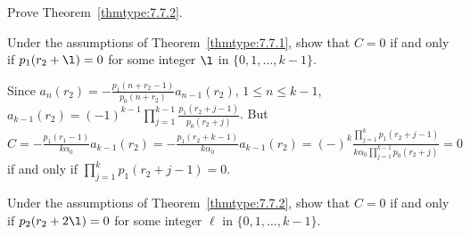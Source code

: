 \documentclass{ximera}
\begin{document}
\begin{problem}\label{exer:7.7.43}
Prove Theorem~\ref{thmtype:7.7.2}.
\end{problem}

\begin{problem}\label{exer:7.7.44}
Under the assumptions of Theorem~\ref{thmtype:7.7.1}, show that $C=0$
 if and only if $p_1(r_2+\l)=0$ for some
integer $\l$ in $\{0,1,\dots,k-1\}$.

\begin{solution}
    Since
$a_n(r_2)=-\frac{p_1(n+r_2-1)}{ p_0(n+r_2)}a_{n-1}(r_2)$,
$1\le n\le k-1$, $a_{k-1}(r_2)=(-1)^{k-1}\prod_{j=1}^{k-1}
\frac{p_1(r_2+j-1)}{ p_0(r_2+j)}$. But $C=-\frac{p_1(r_1-1)}{
k\alpha_0}a_{k-1}(r_2)=-\frac{p_1(r_2+k-1)}{ k\alpha_0}a_{k-1}(r_2)
=(-)^k\frac{\prod_{j=1}^kp_1(r_2+j-1)}{ k\alpha_0\prod_{j=1}^{k-1}
p_0(r_2+j)}=0$ if and only if $\prod_{j=1}^kp_1(r_2+j-1)=0$.
\end{solution}
\end{problem}


\begin{problem}\label{exer:7.7.45}
Under the assumptions of Theorem~\ref{thmtype:7.7.2}, show that $C=0$
 if and only if $p_2(r_2+2\l)=0$ for some
integer $\ell$ in $\{0,1,\dots,k-1\}$.
\end{problem}
\end{document}
